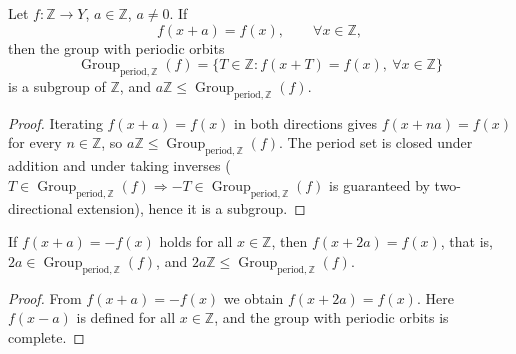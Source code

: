 \begin{theorem}\label{thm:translation_equation_Z}
Let $f:\mathbb{Z}\to Y$, $a\in\mathbb{Z}$, $a\ne0$. If
\[
f(x+a)=f(x),\qquad \forall x\in\mathbb{Z},
\]
then the group with periodic orbits
\[
\operatorname{Group}_{\mathrm{period},\mathbb{Z}}(f)=\{T\in\mathbb{Z}: f(x+T)=f(x),\ \forall x\in\mathbb{Z}\}
\]
is a subgroup of $\mathbb{Z}$, and $a\mathbb{Z}\le\operatorname{Group}_{\mathrm{period},\mathbb{Z}}(f)$.
\end{theorem}

\begin{proof}
Iterating $f(x+a)=f(x)$ in both directions gives $f(x+na)=f(x)$ for every $n\in\mathbb{Z}$, so $a\mathbb{Z}\le\operatorname{Group}_{\mathrm{period},\mathbb{Z}}(f)$. The period set is closed under addition and under taking inverses ($T\in\operatorname{Group}_{\mathrm{period},\mathbb{Z}}(f)\Rightarrow -T\in\operatorname{Group}_{\mathrm{period},\mathbb{Z}}(f)$ is guaranteed by two-directional extension), hence it is a subgroup.
\end{proof}

\begin{corollary}\label{cor:antiperiod_Z}
If $f(x+a)=-f(x)$ holds for all $x\in\mathbb{Z}$, then $f(x+2a)=f(x)$, that is, $2a\in\operatorname{Group}_{\mathrm{period},\mathbb{Z}}(f)$, and $2a\mathbb{Z}\le\operatorname{Group}_{\mathrm{period},\mathbb{Z}}(f)$.
\end{corollary}

\begin{proof}
From $f(x+a)=-f(x)$ we obtain $f(x+2a)=f(x)$. Here $f(x-a)$ is defined for all $x\in\mathbb{Z}$, and the group with periodic orbits is complete.
\end{proof}

